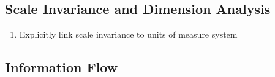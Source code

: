 


\subsection{Scale Invariance and Dimension Analysis}
\label{sec:scale-invariance}

\begin{enumerate}
\item Explicitly link scale invariance to units of measure system
\end{enumerate}

\subsection{Information Flow}
\label{sec:information-flow}

